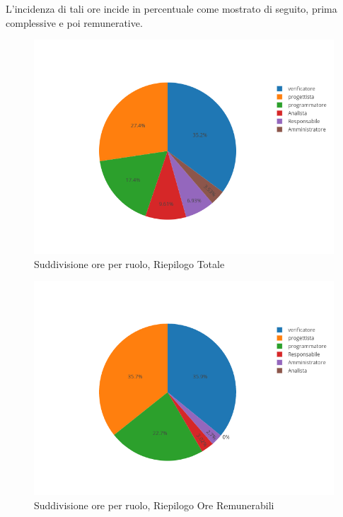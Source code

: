L'incidenza di tali ore incide in percentuale come mostrato di seguito, prima complessive e poi remunerative.
\begin{figure}[H]
	\centering
	\includegraphics[scale=0.6]{img/OreTotali.png}
	\caption{Suddivisione ore per ruolo, Riepilogo Totale}
\end{figure}
\begin{figure}[H]
	\centering
	\includegraphics[scale=0.6]{img/OreRendicontabili.png}
	\caption{Suddivisione ore per ruolo, Riepilogo Ore Remunerabili}
\end{figure}


